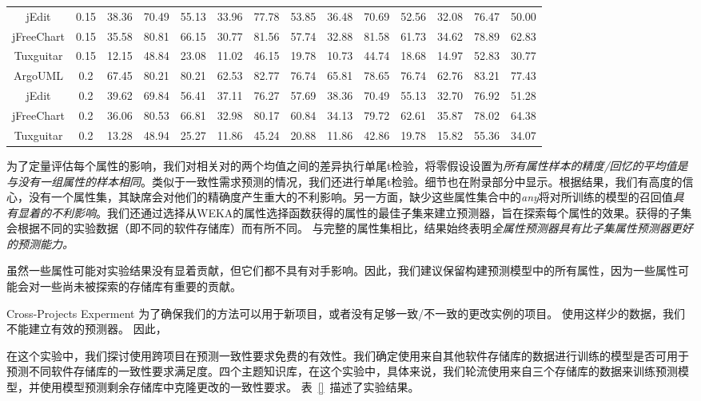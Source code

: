 {\begin{table}[htbp]
\begin{tabular}{cccccccccccccc}
jEdit&0.15&	38.36&	70.49&	55.13&	33.96&	77.78&	53.85&	36.48&	70.69&	52.56&	32.08&	76.47&	50.00\\
jFreeChart&0.15&	35.58&	80.81&	66.15&	30.77&	81.56&	57.74&	32.88&	81.58&	61.73&	34.62&	78.89&	62.83\\
Tuxguitar&0.15&	12.15&	48.84&	23.08&	11.02&	46.15&	19.78&	10.73&	44.74&	18.68&	14.97&	52.83&	30.77\\
\hline
ArgoUML&0.2&	67.45&	80.21&	80.21&	62.53&	82.77&	76.74&	65.81&	78.65&	76.74&	62.76&	83.21&	77.43\\
jEdit&0.2&	39.62&	69.84&	56.41&	37.11&	76.27&	57.69&	38.36&	70.49&	55.13&	32.70&	76.92&	51.28\\
jFreeChart&0.2&	36.06&	80.53&	66.81&	32.98&	80.17&	60.84&	34.13&	79.72&	62.61&	35.87&	78.02&	64.38\\
Tuxguitar&0.2&	13.28&	48.94&	25.27&	11.86&	45.24&	20.88&	11.86&	42.86&	19.78&	15.82&	55.36&	34.07\\
\hline
\bottomrule[1.5pt]
\end{tabular}
\end{table}

为了定量评估每个属性的影响，我们对相关对的两个均值之间的差异执行单尾t检验，将零假设设置为{\em 所有属性样本的精度/回忆的平均值是与没有一组属性的样本相同}。类似于一致性需求预测的情况，我们还进行单尾t检验。细节也在附录部分中显示。根据结果​​，我们有高度的信心，没有一个属性集，其缺席会对他们的精确度产生重大的不利影响。另一方面，缺少这些属性集合中的{\em  any}将对所训练的模型的召回值{\em 具有显着的不利影响}。我们还通过选择从WEKA的属性选择函数获得的属性的最佳子集来建立预测器，旨在探索每个属性的效果。获得的子集会根据不同的实验数据（即不同的软件存储库）而有所不同。
与完整的属性集相比，结果始终表明{\em 全属性预测器具有比子集属性预测器更好的预测能力。}

虽然一些属性可能对实验结果没有显着贡献，但它们都不具有对手影响。因此，我们建议保留构建预测模型中的所有属性，因为一些属性可能会对一些尚未被探索的存储库有重要的贡献。

{Cross-Projects Experment}
为了确保我们的方法可以用于新项目，或者没有足够一致/不一致的更改实例的项目。 使用这样少的数据，我们不能建立有效的预测器。 因此，

在这个实验中，我们探讨使用跨项目在预测一致性要求免费的有效性。我们确定使用来自其他软件存储库的数据进行训练的模型是否可用于预测不同软件存储库的一致性要求满足度。四个主题知识库，在这个实验中，具体来说，我们轮流使用来自三个存储库的数据来训练预测模型，并使用模型预测剩余存储库中克隆更改的一致性要求。
表~\ref{}~描述了实验结果。

}
